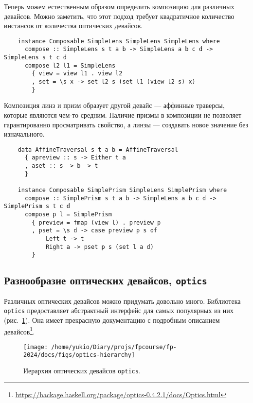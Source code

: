 Теперь можем естественным образом определить композицию для различных девайсов.
Можно заметить, что этот подход требует квадратичное количество инстансов от количества оптических девайсов.

\begin{verbatim}
    instance Composable SimpleLens SimpleLens SimpleLens where
      compose :: SimpleLens s t a b -> SimpleLens a b c d -> SimpleLens s t c d
      compose l2 l1 = SimpleLens
        { view = view l1 . view l2
        , set = \s x -> set l2 s (set l1 (view l2 s) x)
        }
\end{verbatim}

Композиция линз и призм образует другой девайс --- аффинные траверсы, которые являются чем-то средним.
Наличие призмы в композиции не позволяет гарантированно просматривать свойство, а линзы --- создавать новое значение без изначального.
\begin{verbatim}
    data AffineTraversal s t a b = AffineTraversal
      { apreview :: s -> Either t a
      , aset :: s -> b -> t
      }

    instance Composable SimplePrism SimpleLens SimplePrism where
      compose :: SimplePrism s t a b -> SimpleLens a b c d -> SimplePrism s t c d
      compose p l = SimplePrism
        { preview = fmap (view l) . preview p
        , pset = \s d -> case preview p s of
            Left t -> t
            Right a -> pset p s (set l a d)
        }
\end{verbatim}

\subsection{Разнообразие оптических девайсов, \texttt{optics}} \label{subsec:optics}

Различных оптических девайсов можно придумать довольно много.
Библиотека \texttt{optics} предоставляет абстрактный интерфейс для самых популярных из них (рис.~\ref{fig:optics-hierarchy}).
Она имеет прекрасную документацию с подробным описанием девайсов\footnote{\url{https://hackage.haskell.org/package/optics-0.4.2.1/docs/Optics.html}}.

\begin{figure}
    \centering
    \texttt{[image: /home/yukio/Diary/projs/fpcourse/fp-2024/docs/figs/optics-hierarchy]}
    \caption{Иерархия оптических девайсов \texttt{optics}.}
    \label{fig:optics-hierarchy}
\end{figure}

